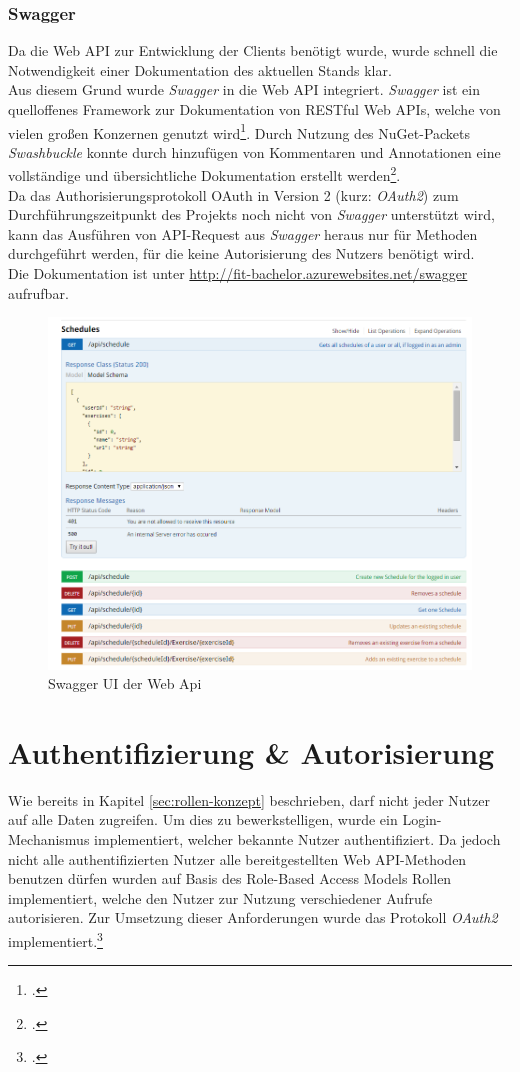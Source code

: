 \subsubsection*{Swagger}
\label{sssec:Swagger}
Da die Web \ac{API} zur Entwicklung der Clients benötigt wurde, wurde schnell die Notwendigkeit einer Dokumentation des aktuellen Stands klar. \\
Aus diesem Grund wurde \textit{Swagger} in die Web \ac{API} integriert. \textit{Swagger} ist ein quelloffenes Framework zur Dokumentation von \ac{REST}ful Web \ac{API}s, welche von vielen großen Konzernen genutzt wird\footcite{swagger}. Durch Nutzung des \gls{NuGet}-Packets \textit{Swashbuckle} konnte durch hinzufügen von Kommentaren und Annotationen eine vollständige und übersichtliche Dokumentation erstellt werden\footcite{implementing-Swagger}. \\
Da das Authorisierungsprotokoll OAuth in Version 2 (kurz: \textit{OAuth2}) zum Durchführungszeitpunkt des Projekts noch nicht von \textit{Swagger} unterstützt wird, kann das Ausführen von API-Request aus \textit{Swagger} heraus nur für Methoden durchgeführt werden, für die keine Autorisierung des Nutzers benötigt wird. \\
Die Dokumentation ist unter \href{http://fit-bachelor.azurewebsites.net/swagger}{http://fit-bachelor.azurewebsites.net/swagger} aufrufbar. 
\begin{figure}[h]
\centering
\includegraphics[width=0.8\linewidth]{content/images/Swagger-UI-fIT}
\caption{Swagger UI der Web Api}
\label{pic:swagger-UI}
\end{figure}


\section{Authentifizierung \& Autorisierung}
\label{sec:server-authorisierung}
Wie bereits in Kapitel \ref{sec:rollen-konzept} beschrieben, darf nicht jeder Nutzer auf alle Daten zugreifen. Um dies zu bewerkstelligen, wurde ein Login-Mechanismus implementiert, welcher bekannte Nutzer authentifiziert. Da jedoch nicht alle authentifizierten Nutzer alle bereitgestellten Web \ac{API}-Methoden benutzen dürfen wurden auf Basis des \ac{Role-Based Access Models} Rollen implementiert, welche den Nutzer zur Nutzung verschiedener Aufrufe autorisieren. Zur Umsetzung dieser Anforderungen wurde das Protokoll \textit{OAuth2} implementiert.\footcite{online:WebApi_Authorize}
